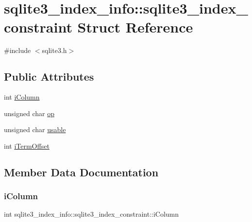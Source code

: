 \hypertarget{structsqlite3__index__info_1_1sqlite3__index__constraint}{}\section{sqlite3\+\_\+index\+\_\+info\+::sqlite3\+\_\+index\+\_\+constraint Struct Reference}
\label{structsqlite3__index__info_1_1sqlite3__index__constraint}


{\ttfamily \#include $<$sqlite3.\+h$>$}

\subsection*{Public Attributes}
\begin{DoxyCompactItemize}
\item 
int \mbox{\hyperlink{structsqlite3__index__info_1_1sqlite3__index__constraint_a0f1e207060420058ee2881f2ea368e3a}{i\+Column}}
\item 
unsigned char \mbox{\hyperlink{structsqlite3__index__info_1_1sqlite3__index__constraint_a362f4ec1f71975cb0ac39a8b5e4b1476}{op}}
\item 
unsigned char \mbox{\hyperlink{structsqlite3__index__info_1_1sqlite3__index__constraint_ae16e62caeab743cc68bb22227dacb501}{usable}}
\item 
int \mbox{\hyperlink{structsqlite3__index__info_1_1sqlite3__index__constraint_a4e8368da66f34b7f07b369984b813d1b}{i\+Term\+Offset}}
\end{DoxyCompactItemize}


\subsection{Member Data Documentation}
\mbox{\label{structsqlite3__index__info_1_1sqlite3__index__constraint_a0f1e207060420058ee2881f2ea368e3a}} 
\subsubsection{\texorpdfstring{iColumn}{iColumn}}
{\footnotesize\ttfamily int sqlite3\+\_\+index\+\_\+info\+::sqlite3\+\_\+index\+\_\+constraint\+::i\+Column}

